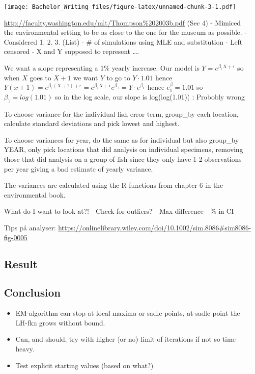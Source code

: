 \documentclass[]{article}
\providecommand{\tightlist}{%
  \setlength{\itemsep}{0pt}\setlength{\parskip}{0pt}}
\begin{document}
\texttt{[image: Bachelor\_Writing\_files/figure-latex/unnamed-chunk-3-1.pdf]}

\url{http://faculty.washington.edu/mlt/Thompson\%202003b.pdf} (Sec 4) -
Mimiced the environmental setting to be as close to the one for the
museum as possible. - Considered 1. 2. 3. (List) - \# of simulations
using MLE and substitution - Left censored - X and Y supposed to
represent \ldots.

We want a slope representing a 1\% yearly increase. Our model is
\(Y=e^{\beta_1 X + \epsilon}\) so when \(X\) goes to \(X+1\) we want
\(Y\) to go to \(Y\cdot 1.01\) hence
\(Y(x+1)=e^{\beta_1 (X + 1) + \epsilon} = e^{\beta_1 X + \epsilon}e^{\beta_1}=Y\cdot e^{\beta_1}\)
hence \(e^\beta_1=1.01\) so \(\beta_1=log(1.01)\) so in the log scale,
our slope is log(log(1.01)) : Probobly wrong

To choose variance for the individual fish error term, group\_by each
location, calculate standard deviations and pick lowest and highest.

To choose variances for year, do the same as for individual but also
group\_by YEAR, only pick locations that did analysis on individual
specimens, removing those that did analysis on a group of fish since
they only have 1-2 observations per year giving a bad estimate of yearly
variance.

The variances are calculated using the R functions from chapter 6 in the
environmental book.

What do I want to look at?! - Check for outliers? - Max difference - \%
in CI

Tips på analyser:
\url{https://onlinelibrary.wiley.com/doi/10.1002/sim.8086\#sim8086-fig-0005}

\hypertarget{result}{%
\subsection{Result}\label{result}}

\hypertarget{conclusion}{%
\subsection{Conclusion}\label{conclusion}}

\begin{itemize}
\tightlist
\item
  EM-algorithm can stop at local maxima or sadle points, at sadle point
  the LH-fkn grows without bound.
\item
  Can, and should, try with higher (or no) limit of iterations if not so
  time heavy.
\item
  Test explicit starting values (based on what?)
\end{itemize}
\end{document}
